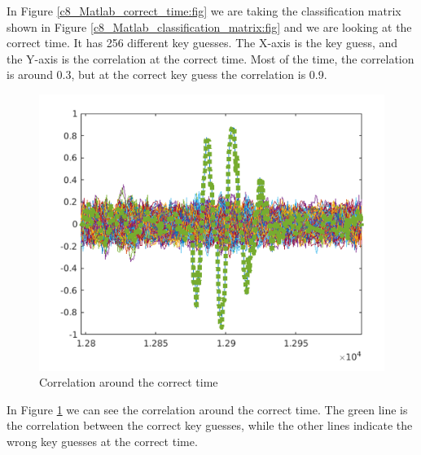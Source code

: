 In Figure \ref{c8_Matlab_correct_time:fig} we are taking the classification
matrix shown in Figure \ref{c8_Matlab_classification_matrix:fig}  and we are looking at
the correct time. It has 256 different key guesses. The X-axis is the key guess, and the Y-axis is the correlation at the correct time. Most of the time, the
correlation is around 0.3, but at the correct key guess the correlation is 0.9.  

\begin{figure}[!ht]
    \centering
    \includegraphics[width=1.0\textwidth]{images/chapter8/correlation_around_correct_time.png}
    \caption{Correlation around the correct time} \label{c8_Matlab_correlation_around_the_correct_time:fig}
\end{figure}

In Figure \ref{c8_Matlab_correlation_around_the_correct_time:fig} we can see the
correlation around the correct time. The green line is the correlation between the
correct key guesses, while the other lines indicate the wrong key
guesses at the correct time.

